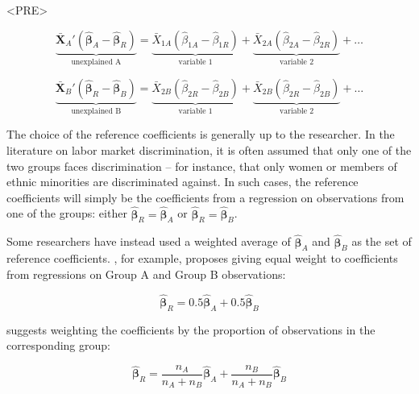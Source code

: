 <PRE>\documentclass[nojss]{jss}
\begin{document}
\begin{equation}\label{unexplained_A}
\underbrace{\boldsymbol{\bar{X}}_{A}' (\boldsymbol{\hat{\beta}}_{A} - \boldsymbol{\hat{\beta}}_{R})}_\text{unexplained A} = \underbrace{\bar{X}_{1A} (\hat{\beta}_{1A} - \hat{\beta}_{1R})}_\text{variable 1} + \underbrace{\bar{X}_{2A} (\hat{\beta}_{2A} - \hat{\beta}_{2R})}_\text{variable 2} + \dots
\end{equation}

\begin{equation}\label{unexplained_B}
\underbrace{\boldsymbol{\bar{X}}_{B}' (\boldsymbol{\hat{\beta}}_{R} - \boldsymbol{\hat{\beta}}_{B})}_\text{unexplained B} =  \underbrace{\bar{X}_{2B} (\hat{\beta}_{2R} - \hat{\beta}_{2B})}_\text{variable 1} + \underbrace{\bar{X}_{2B} (\hat{\beta}_{2R} - \hat{\beta}_{2B})}_\text{variable 2} + \dots
\end{equation}

The choice of the reference coefficients is generally up to the researcher. In the literature on labor market discrimination, it is often assumed that only one of the two groups faces discrimination -- for instance, that only women or members of ethnic minorities are discriminated against. In such cases, the reference coefficients will simply be the coefficients from a regression on observations from one of the groups: either $\boldsymbol{\hat{\beta}}_{R} = \boldsymbol{\hat{\beta}}_{A}$ or $\boldsymbol{\hat{\beta}}_{R} = \boldsymbol{\hat{\beta}}_{B}$.

Some researchers have instead used a weighted average of $\boldsymbol{\hat{\beta}}_{A}$ and $\boldsymbol{\hat{\beta}}_{B}$ as the set of reference coefficients. \citet{Reimers1983}, for example, proposes giving equal weight to coefficients from regressions on Group A and Group B observations:

\begin{equation}\label{reimers}
\boldsymbol{\hat{\beta}}_{R} = 0.5\boldsymbol{\hat{\beta}}_{A} + 0.5\boldsymbol{\hat{\beta}}_{B}
\end{equation}

\citet{Cotton1988} suggests weighting the coefficients by the proportion of observations in the corresponding group:

\begin{equation}\label{cotton}
\boldsymbol{\hat{\beta}}_{R} = \frac{n_{A}}{n_{A}+n_{B}}\boldsymbol{\hat{\beta}}_{A} + \frac{n_{B}}{n_{A}+n_{B}}\boldsymbol{\hat{\beta}}_{B}
\end{equation}
\end{document}
